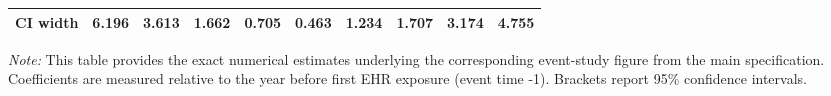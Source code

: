\begin{landscape}
\begin{table}[!h]
\begin{tabular}[t]{lccccccccc}
\hspace{1em}CI width & 6.196 & 3.613 & 1.662 & 0.705 & 0.463 & 1.234 & 1.707 & 3.174 & 4.755\\
\bottomrule
\end{tabular}
\begin{tablenotes}
\item \textit{Note: } This table provides the exact numerical estimates underlying the corresponding event-study figure from the main specification. Coefficients are measured relative to the year before first EHR exposure (event time -1). Brackets report 95\% confidence intervals. 
\end{tablenotes}
\end{table}
\end{landscape}
